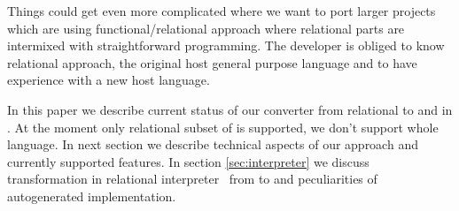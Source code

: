Things could get even more complicated where we want to port larger projects which are using functional/relational approach where relational parts are intermixed with straightforward programming.
The developer is obliged to know relational approach, the original host general purpose language and to have experience  with a new host language.

In this paper we describe current status of our converter from relational \OCanren{} to \Klogic{} and \miniKanren{} in \Scheme{}.
At the moment only relational subset of \OCanren{} is supported, we don't support whole \OCaml{} language.
In next section we describe technical aspects of our approach and currently supported features.
In section \ref{sec:interpreter} we discuss transformation in relational interpreter~\cite{Untagged} from \OCanren{} to \Scheme{} and peculiarities of autogenerated implementation.


